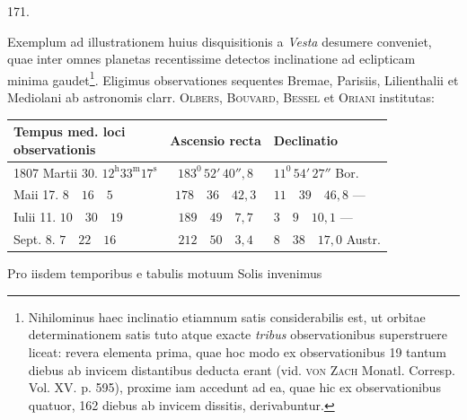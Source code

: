\par{}\medskip
\begin{center}\hypertarget{native-236-article171}{}171.\end{center}
Exemplum ad illustrationem huius disquisitionis a \emph{Vesta} desumere conveniet, quae inter omnes planetas recentissime detectos inclinatione ad eclipticam minima gaudet\footnote{Nihilominus haec inclinatio etiamnum satis considerabilis est, ut orbitae determinationem satis tuto atque exacte \emph{tribus} observationibus superstruere liceat: revera elementa prima, quae hoc modo ex observationibus 19 tantum diebus ab invicem distantibus deducta erant (vid. \textsc{von Zach} Monatl. Corresp. Vol. XV. p. 595), proxime iam accedunt ad ea, quae hic ex observationibus quatuor, 162 diebus ab invicem dissitis, derivabuntur.}. Eligimus observationes sequentes Bremae, Parisiis, Lilienthalii et Mediolani ab astronomis clarr. \textsc{Olbers}, \textsc{Bouvard}, \textsc{Bessel} et \textsc{Oriani} institutas:
\begin{center}
\begingroup\fontsize{9}{11}\selectfont\setlength{\tabcolsep}{3pt}
\begin{tabular}{|l|c|l|}
\hline
\shortstack{Tempus med. loci\\observationis} & Ascensio recta & Declinatio\\\hline
1807 Martii 30. $12^{\mathrm h}33^{\mathrm m}17^{\mathrm s}$ & $183^0\,52'\,40''{,}8$ & $11^0\,54'\,27''$ Bor.\\
\phantom{1807 }Maii 17. $8\quad16\quad5$ & $178\quad36\quad42{,}3$ & $11\quad39\quad46{,}8$ —\\
\phantom{1807 }Iulii 11. $10\quad30\quad19$ & $189\quad49\quad7{,}7$ & $3\quad9\quad10{,}1$ —\\
\phantom{1807 }Sept. 8. $7\quad22\quad16$ & $212\quad50\quad3{,}4$ & $8\quad38\quad17{,}0$ Austr.\\\hline
\end{tabular}\endgroup
\end{center}
Pro iisdem temporibus e tabulis motuum Solis invenimus
